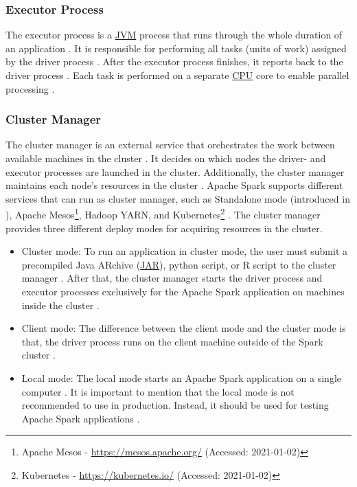 \subsubsection{Executor Process}
The executor process is a \hyperlink{abbr:jvm}{JVM} process that runs through the whole duration of an application \cite{Hien2018Spark, Apache2020Spark}.
It is responsible for performing all tasks (units of work) assigned by the driver process \cite{Chambers2018Spark}.
After the executor process finishes, it reports back to the driver process \cite{Chambers2018Spark}.
Each task is performed on a separate \hyperlink{abbr:cpu}{CPU} core to enable parallel processing \cite{Hien2018Spark}.


\subsubsection{Cluster Manager}
\label{subsubsec:04_spark_architecture_manager}
The cluster manager is an external service that orchestrates the work between available machines in the cluster \cite{Hien2018Spark, Apache2020Spark}.
It decides on which nodes the driver- and executor processes are launched in the cluster.
Additionally, the cluster manager maintains each node's resources in the cluster \cite{Hien2018Spark, Chambers2018Spark}.
Apache Spark supports different services that can run as cluster manager, such as Standalone mode (introduced in ), Apache Mesos\footnote{Apache Mesos - \url{https://mesos.apache.org/} (Accessed: 2021-01-02)}, Hadoop YARN\cite{Murthy2013Yarn}, and Kubernetes\footnote{Kubernetes - \url{https://kubernetes.io/} (Accessed: 2021-01-02)} \cite{Apache2020Spark}.
The cluster manager provides three different deploy modes for acquiring resources in the cluster.
\begin{itemize}
\item Cluster mode:
To run an application in cluster mode, the user must submit a precompiled Java ARchive (\hyperlink{abbr:jar}{JAR}), python script, or R script to the cluster manager \cite{Chambers2018Spark}. After that, the cluster manager starts the driver process and executor processes exclusively for the Apache Spark application on machines inside the cluster \cite{Chambers2018Spark, Hien2018Spark}.

\item Client mode:
The difference between the client mode and the cluster mode is that, the driver process runs on the client machine outside of the Spark cluster \cite{Chambers2018Spark}.

\item Local mode:
The local mode starts an Apache Spark application on a single computer \cite{Chambers2018Spark}. It is important to mention that the local mode is not recommended to use in production. Instead, it should be used for testing Apache Spark applications \cite{Chambers2018Spark}.
\end{itemize}


